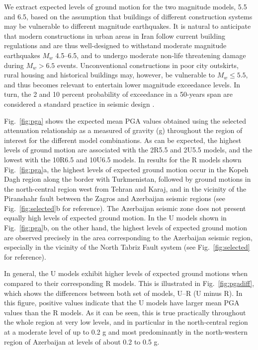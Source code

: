 We extract expected levels of ground motion for the two magnitude models, 5.5 and 6.5, based on the assumption that buildings of different construction systems may be vulnerable to different magnitude earthquakes. It is natural to anticipate that modern constructions in urban areas in Iran follow current building regulations and are thus well-designed to withstand moderate magnitude earthquakes $M_w$ 4.5--6.5, and to undergo moderate non-life threatening damage during $M_w > 6.5$ events. Unconventional constructions in poor city outskirts, rural housing and historical buildings may, however, be vulnerable to $M_w \leq 5.5$, and thus becomes relevant to entertain lower magnitude exceedance levels. In turn, the 2 and 10 percent probability of exceedance in a 50-years span are considered a standard practice in seismic design \citep[e.g.,][]{BHRC2014}.

Fig.~\ref{fig:pga} shows the expected mean PGA values obtained using the selected attenuation relationship as a measured of gravity (g) throughout the region of interest for the different model combinations. As can be expected, the highest levels of ground motion are associated with the 2R5.5 and 2U5.5 models, and the lowest with the 10R6.5 and 10U6.5 models. In results for the R models shown Fig.~\ref{fig:pga}a, the highest levels of expected ground motion occur in the Kopeh Dagh region along the border with Turkmenistan, followed by ground motions in the north-central region west from Tehran and Karaj, and in the vicinity of the Piranshahr fault between the Zagros and Azerbaijan seismic regions (see Fig.~\ref{fig:selected}b for reference). The Azerbaijan seismic zone does not present equally high levels of expected ground motion. In the U models shown in Fig.~\ref{fig:pga}b, on the other hand, the highest levels of expected ground motion are observed precisely in the area corresponding to the Azerbaijan seismic region, especially in the vicinity of the North Tabriz Fault system (see Fig.~\ref{fig:selected} for reference).

In general, the U models exhibit higher levels of expected ground motions when compared to their corresponding R models. This is illustrated in Fig.~\ref{fig:pgadiff}, which shows the differences between both set of models, U--R (U minus R). In this figure, positive values indicate that the U models have larger mean PGA values than the R models. As it can be seen, this is true practically throughout the whole region at very low levels, and in particular in the north-central region at a moderate level of up to 0.2 g and most predominantly in the north-western region of Azerbaijan at levels of about 0.2 to 0.5 g.

